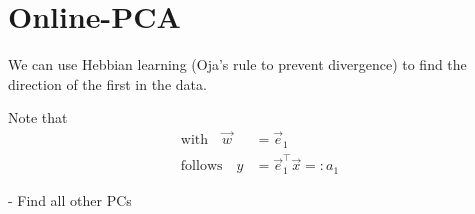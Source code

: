 
\section{Online-PCA}


\begin{frame}
We can use Hebbian learning (Oja's rule to prevent divergence) 
to find the direction of the first  in the data. \\

\pause

Note that
\begin{align}\text{with} \quad \vec w &= \vec e_1\\
\text{follows} \quad y &= \vec e_1^\top \vec x =: a_1
\end{align}


\pause

- Find all other PCs

\end{frame}

